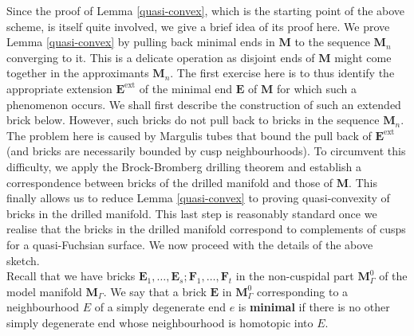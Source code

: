 \documentclass{amsart}
\theoremstyle{definition}
\begin{document}
Since the proof of Lemma  \ref{quasi-convex}, which is the starting point of the above scheme, is itself
quite involved, we give a brief idea of its proof here. We prove Lemma \ref{quasi-convex} by pulling back minimal ends in
$\mathbf{M}$  to the sequence $\mathbf{M}_n$ converging to it. This is a delicate operation as disjoint
ends of $\mathbf{M}$ might come together in the approximants $\mathbf{M}_n$. The first exercise here
is to thus identify the appropriate extension $\mathbf{E}^\mathrm{ext}$ of the minimal end
$\mathbf{E}$ of $\mathbf{M}$ for which such a phenomenon occurs. We shall
first describe the  construction of such an extended brick
below. However, such  bricks do not pull back to bricks in
the sequence $\mathbf{M}_n$. The problem here is caused by Margulis tubes that bound the pull back of
 $\mathbf{E}^\mathrm{ext}$ (and bricks are necessarily bounded by cusp neighbourhoods). To circumvent
 this difficulty, we apply the Brock-Bromberg drilling theorem \cite{BB} and establish
 a correspondence between bricks of the drilled manifold and those of $\mathbf{M}$. This finally
 allows us to reduce Lemma  \ref{quasi-convex} to proving quasi-convexity of bricks in the drilled manifold. This last step is reasonably standard once we realise that the bricks in the drilled
 manifold correspond to complements of cusps for a quasi-Fuchsian surface. We now proceed with the details of the above sketch.\\


Recall that we have bricks $\mathbf E_1, \dots ,\mathbf E_s; \mathbf F_1, \dots , \mathbf F_t$ in the non-cuspidal part $\mathbf M_\Gamma^0$ of the model manifold $\mathbf M_\Gamma$.
We say that a brick $\mathbf E$ in $\mathbf M_\Gamma^0$ corresponding to a neighbourhood $E$ of a simply degenerate end $e$ is {\bf minimal} if there is no other simply degenerate end whose neighbourhood is homotopic into $E$.
\end{document}
